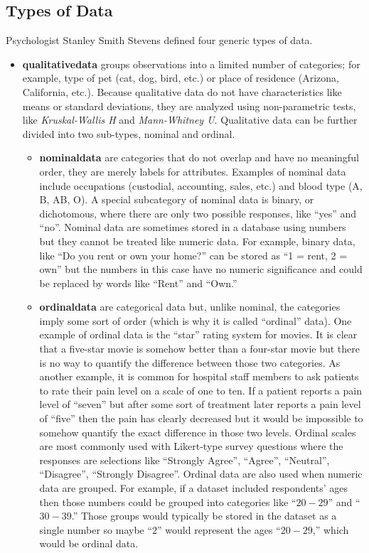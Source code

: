 \subsection{Types of Data}

Psychologist Stanley Smith Stevens defined four generic types of data\cite{stevens1946theory}. 

\begin{itemize}
	
	\item \textbf{\Gls{qualitativedata}} groups observations into a limited number of categories; for example, type of pet (cat, dog, bird, etc.) or place of residence (Arizona, California, etc.). Because qualitative data do not have characteristics like means or standard deviations, they are analyzed using non-parametric tests, like \textit{Kruskal-Wallis H} and \textit{Mann-Whitney U}. Qualitative data can be further divided into two sub-types, nominal and ordinal.
	
	\begin{itemize}
		\item \textbf{\Gls{nominaldata}} are categories that do not overlap and have no meaningful order, they are merely labels for attributes. Examples of nominal data include occupations (custodial, accounting, sales, etc.) and blood type (A, B, AB, O). A special subcategory of nominal data is binary, or dichotomous, where there are only two possible responses, like ``yes'' and ``no''. Nominal data are sometimes stored in a database using numbers but they cannot be treated like numeric data. For example, binary data, like ``Do you rent or own your home?'' can be stored as ``1 = rent, 2 = own'' but the numbers in this case have no numeric significance and could be replaced by words like ``Rent'' and ``Own.''
		
		\item \textbf{\Gls{ordinaldata}} are categorical data but, unlike nominal, the categories imply some sort of order (which is why it is called ``ordinal'' data). One example of ordinal data is the ``star'' rating system for movies. It is clear that a five-star movie is somehow better than a four-star movie but there is no way to quantify the difference between those two categories. As another example, it is common for hospital staff members to ask patients to rate their pain level on a scale of one to ten. If a patient reports a pain level of ``seven'' but after some sort of treatment later reports a pain level of ``five'' then the pain has clearly decreased but it would be impossible to somehow quantify the exact difference in those two levels. Ordinal scales are most commonly used with Likert-type survey questions where the responses are selections like ``Strongly Agree'', ``Agree'', ``Neutral'', ``Disagree'', ``Strongly Disagree''. Ordinal data are also used when numeric data are grouped. For example, if a dataset included respondents' ages then those numbers could be grouped into categories like ``$ 20-29 $'' and ``$ 30-39 $.'' Those groups would typically be stored in the dataset as a single number so maybe ``$ 2 $'' would represent the ages ``$ 20-29 $,'' which would be ordinal data.
	\end{itemize}
	

\end{itemize}
